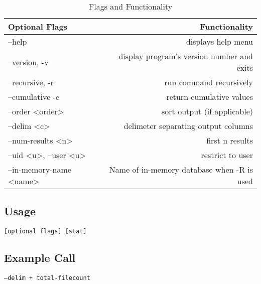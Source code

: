 \begin{table} [h]
  \centering
  \begin{tabular}{l|r}
    Optional Flags & Functionality\\\hline
    --help & displays help menu\\
    --version, -v & display program's version number and exits \\
    --recursive, -r & run command recursively \\
    --cumulative -c & return cumulative values \\
    --order \textless order\textgreater & sort output (if applicable)\\
    --delim \textless c\textgreater & delimeter separating output columns\\
    --num-results \textless n\textgreater & first n results \\
    --uid \textless u\textgreater, --user \textless u\textgreater & restrict to user \\
    --in-memory-name \textless name\textgreater & Name of in-memory database when -R is used
  \end{tabular}
  \caption{\label{fig:gufi_stats_flags} \gufistats Flags and Functionality}
\end{table}

\subsection{Usage}
\gufistats \texttt{[optional flags] [stat]}

\subsection{Example Call}
\gufistats \texttt{--delim + total-filecount}
